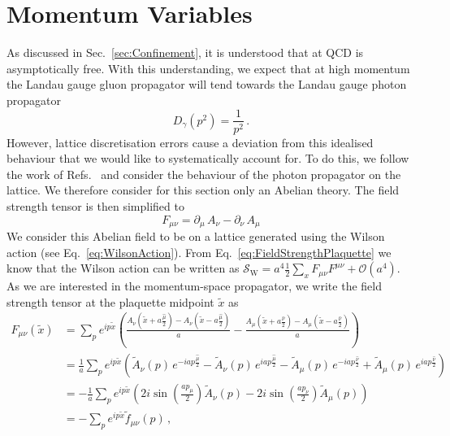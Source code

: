 \section{Momentum Variables}\label{sec:MomentumVariables}
As discussed in Sec.~\ref{sec:Confinement}, it is understood that at QCD is asymptotically free. With this understanding, we expect that at high momentum the Landau gauge gluon propagator will tend towards the Landau gauge photon propagator~\cite{ryder1996quantum}
%
\begin{equation}
D_\gamma(p^2) = \frac{1}{p^2}\, .
\end{equation}
%
However, lattice discretisation errors cause a deviation from this idealised behaviour that we would like to systematically account for. To do this, we follow the work of Refs.~\cite{Weisz:1982zw, Weisz:1983bn,Luscher:1985zq,Symanzik:1983dc,Symanzik:1983gh} and consider the behaviour of the photon propagator on the lattice. We therefore consider for this section only an Abelian theory. The field strength tensor is then simplified to
%
\begin{equation}
F_{\mu\nu} = \partial_\mu \,A_\nu - \partial_\nu\,A_\mu
\end{equation}
%
We consider this Abelian field to be on a lattice generated using the Wilson action (see Eq.~\ref{eq:WilsonAction}). From Eq.~\ref{eq:FieldStrengthPlaquette} we know that the Wilson action can be written as $\mathcal{S}_\text{W} = a^4\frac{1}{2}\sum_x F_{\mu\nu}F^{\mu\nu} + \mathcal{O}(a^4)$. As we are interested in the momentum-space propagator, we write the field strength tensor at the plaquette midpoint $\tilde{x}$ as
%
\begin{align*}
F_{\mu\nu}(\tilde{x}) &= \sum_p e^{ip\tilde{x}} \left(\frac{A_\nu\left(\tilde{x}+a\frac{\hat{\mu}}{2}\right) - A_\nu\left(\tilde{x}-a\frac{\hat{\mu}}{2} \right)}{a} - \frac{A_\mu\left(\tilde{x}+a\frac{\hat{\nu}}{2}\right) - A_\mu\left(\tilde{x}-a\frac{\hat{\nu}}{2} \right)}{a}\right)\\
&= \frac{1}{a} \sum_p e^{ip\tilde{x}} \left(\tilde{A}_\nu(p)\, e^{-iap\frac{\hat{\mu}}{2}} - \tilde{A}_\nu(p)\, e^{iap\frac{\hat{\mu}}{2}} - \tilde{A}_\mu(p)\, e^{-iap\frac{\hat{\nu}}{2}} + \tilde{A}_\mu(p)\, e^{iap\frac{\hat{\nu}}{2}}\right)\\
&= -\frac{1}{a} \sum_p e^{ip\tilde{x}}\left(2i\sin\left(\frac{a p_\mu}{2}\right)\tilde{A}_\nu(p) - 2i\sin\left(\frac{a p_\nu}{2}\right)\tilde{A}_\mu(p)\right)\\
&= - \sum_p e^{ip\tilde{x}}\tilde{f}_{\mu\nu}(p)\, ,
\end{align*}
